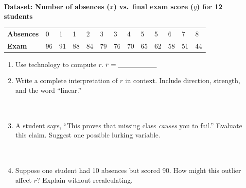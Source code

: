 \documentclass[10pt]{article}
\begin{document}
\vspace{0.1in}

\begin{tcolorbox}[colback=white, colframe=black!40, boxrule=0.8pt, arc=2mm,
    left=4mm, right=4mm, top=3mm, bottom=3mm,
    title={\textbf{Tier A --- Approaching Proficiency}}, fonttitle=\bfseries, halign title=center]
\small

\textbf{Dataset: Number of absences ($x$) vs.\ final exam score ($y$) for 12 students}

\vspace{6pt}
\renewcommand{\arraystretch}{1.4}
\begin{tabularx}{\linewidth}{@{} l *{12}{C{0.72cm}} @{}}
\textbf{Absences} & 0 & 1 & 1 & 2 & 3 & 3 & 4 & 5 & 5 & 6 & 7 & 8 \\
\textbf{Exam}     & 96 & 91 & 88 & 84 & 79 & 76 & 70 & 65 & 62 & 58 & 51 & 44 \\
\end{tabularx}

\vspace{10pt}
\begin{enumerate}[leftmargin=1.6em, itemsep=0.16in]
  \item Use technology to compute $r$. \quad $r = \blank{2cm}$
  \item Write a complete interpretation of $r$ in context. Include direction, strength,
        and the word ``linear.''\\[6pt]
        \writeline\\[2pt]\writeline\\[2pt]\writeline
  \item A student says, ``This proves that missing class \emph{causes} you to fail.''
        Evaluate this claim. Suggest one possible lurking variable.\\[6pt]
        \writeline\\[2pt]\writeline\\[2pt]\writeline
  \item Suppose one student had 10 absences but scored 90. How might this outlier affect $r$?
        Explain without recalculating.\\[6pt]
        \writeline\\[2pt]\writeline
\end{enumerate}
\end{tcolorbox}

\vspace{0.1in}
\end{document}
